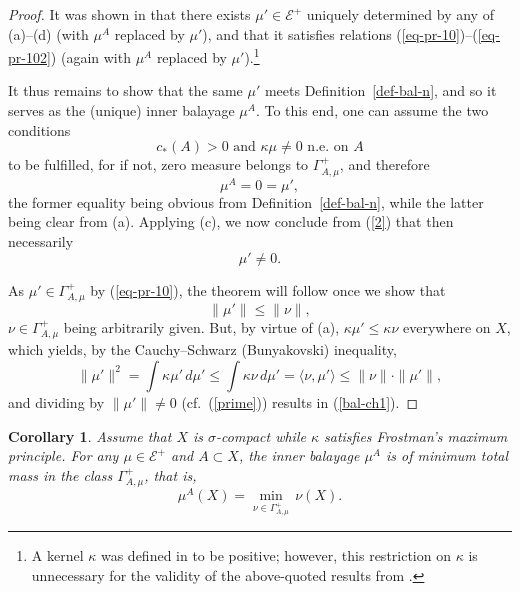 \documentclass[12pt,a4paper,reqno]{amsart} %
\theoremstyle{lause}
\theoremstyle{maaritelma}
\theoremstyle{lause}
\newtheorem{corollary}[theorem]{Corollary}
\theoremstyle{maaritelma}
\numberwithin{equation}{section}
\begin{document}
\begin{proof} It was shown in \cite[Section~4]{Z-arx1} that there exists $\mu'\in\mathcal E^+$ uniquely determined by any of (a)--(d) (with $\mu^A$ replaced by $\mu'$), and that it satisfies relations (\ref{eq-pr-10})--(\ref{eq-pr-102}) (again with $\mu^A$ replaced by $\mu'$).\footnote{A kernel $\kappa$ was defined in \cite{Z-arx1} to be positive; however, this restriction on $\kappa$ is unnecessary for the validity of the ab\-ove-quo\-ted results from \cite{Z-arx1}.}

It thus remains to show that the same $\mu'$ meets Definition~\ref{def-bal-n}, and so it serves as the (unique) inner balayage $\mu^A$. To this end, one can assume the two conditions
\begin{equation}\label{2}c_*(A)>0\text{ \ and \ }\kappa\mu\ne0\text{ \ n.e.\ on $A$}\end{equation}
to be fulfilled, for if not, zero measure belongs to $\Gamma_{A,\mu}^+$, and therefore
\[\mu^A=0=\mu',\] the former equality being obvious from Definition~\ref{def-bal-n}, while the latter being clear from (a).
Applying (c), we now conclude from (\ref{2}) that then necessarily
\begin{equation}\label{prime}\mu'\ne0.\end{equation}

As $\mu'\in\Gamma_{A,\mu}^+$ by (\ref{eq-pr-10}), the theorem will follow once we show that
\begin{equation}\label{bal-ch1}\|\mu'\|\leqslant\|\nu\|,\end{equation}
$\nu\in\Gamma_{A,\mu}^+$ being arbitrarily given. But, by virtue of (a), $\kappa\mu'\leqslant\kappa\nu$  everywhere on $X$,
which yields, by the Cauchy--Schwarz (Bunyakovski) inequality,
\[\|\mu'\|^2=\int\kappa\mu'\,d\mu'\leqslant\int\kappa\nu\,d\mu'=\langle\nu,\mu'\rangle\leqslant\|\nu\|\cdot\|\mu'\|,\]
and dividing by $\|\mu'\|\ne0$ (cf.\ (\ref{prime})) results in (\ref{bal-ch1}).
\end{proof}

\begin{corollary}\label{bal-tot-m} Assume that\/ $X$ is\/ $\sigma$-compact while\/ $\kappa$ satisfies Frostman's maximum principle.
For any\/ $\mu\in\mathcal E^+$ and\/ $A\subset X$, the inner balayage\/ $\mu^A$ is of minimum total mass in the class\/ $\Gamma_{A,\mu}^+$, that is,
\begin{equation}\label{eq-t-m}\mu^A(X)=\min_{\nu\in\Gamma_{A,\mu}^+}\,\nu(X).\end{equation}
\end{corollary}
\end{document}
